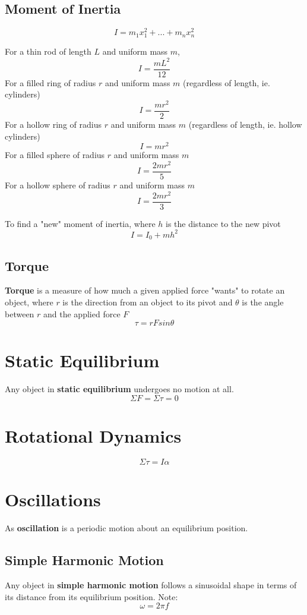 \documentclass[12pt]{article}
\begin{document}
\subsection*{Moment of Inertia}
\[ I = m_1x_1^2 + ... + m_nx_n^2 \]

For a thin rod of length $L$ and uniform mass $m$, \[ I = \frac{mL^2}{12} \]
For a filled ring of radius $r$ and uniform mass $m$ (regardless of length, ie. cylinders) \[ I = \frac{mr^2}{2} \]
For a hollow ring of radius $r$ and uniform mass $m$ (regardless of length, ie. hollow cylinders) \[ I = mr^2 \]
For a filled sphere of radius $r$ and uniform mass $m$ \[ I = \frac{2mr^2}{5} \]
For a hollow sphere of radius $r$ and uniform mass $m$ \[ I = \frac{2mr^2}{3} \]

To find a "new" moment of inertia, where $h$ is the distance to the new pivot \[ I = I_0 + mh^2 \]

\subsection*{Torque}
{\bf Torque} is a measure of how much a given applied force "wants" to rotate an object, where $r$ is the direction from an object to its pivot and $\theta$ is the angle between $r$ and the applied force $F$ \[ \tau = rFsin\theta \]

\section*{Static Equilibrium}
Any object in {\bf static equilibrium} undergoes no motion at all. \[ \Sigma F = \Sigma\tau = 0 \]

\section*{Rotational Dynamics}
\[ \Sigma\tau = I\alpha \]

\section*{Oscillations}
As {\bf oscillation} is a periodic motion about an equilibrium position.

\subsection*{Simple Harmonic Motion}
Any object in {\bf simple harmonic motion} follows a sinusoidal shape in terms of its distance from its equilibrium position. Note: \[ \omega = 2\pi f \]
\end{document}
